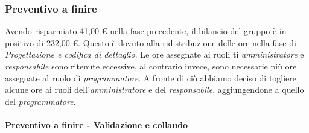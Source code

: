 \documentclass[../piano_di_progetto.tex]{subfiles}
\begin{document}
\subsubsection{Preventivo a finire}
\label{sub:cons_prev_fine_4} 
Avendo risparmiato 41,00 € nella fase precedente, il bilancio del gruppo è in positivo di 232,00 €. Questo è dovuto alla ridistribuzione delle ore nella fase di \emph{Progettazione e codifica di dettaglio}. Le ore assegnate ai ruoli ti \emph{amministratore} e \emph{responsabile} sono ritenute eccessive, al contrario invece, sono necessarie più ore assegnate al ruolo di \emph{programmatore}. A fronte di ciò abbiamo deciso di togliere alcune ore ai ruoli dell'\emph{amministratore} e del \emph{responsabile}, aggiungendone a quello del \emph{programmatore}. 

\paragraph{Preventivo a finire - Validazione e collaudo}
\end{document}

